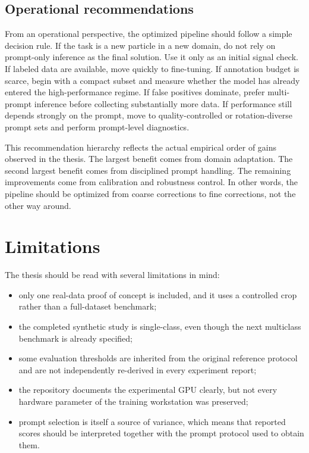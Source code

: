 \documentclass[12pt,a4paper]{report}
\begin{document}
\subsection{Operational recommendations}
From an operational perspective, the optimized pipeline should follow a simple decision rule. If the task is a new particle in a new domain, do not rely on prompt-only inference as the final solution. Use it only as an initial signal check. If labeled data are available, move quickly to fine-tuning. If annotation budget is scarce, begin with a compact subset and measure whether the model has already entered the high-performance regime. If false positives dominate, prefer multi-prompt inference before collecting substantially more data. If performance still depends strongly on the prompt, move to quality-controlled or rotation-diverse prompt sets and perform prompt-level diagnostics.

This recommendation hierarchy reflects the actual empirical order of gains observed in the thesis. The largest benefit comes from domain adaptation. The second largest benefit comes from disciplined prompt handling. The remaining improvements come from calibration and robustness control. In other words, the pipeline should be optimized from coarse corrections to fine corrections, not the other way around.

\section{Limitations}
The thesis should be read with several limitations in mind:
\begin{itemize}
  \item only one real-data proof of concept is included, and it uses a controlled crop rather than a full-dataset benchmark;
  \item the completed synthetic study is single-class, even though the next multiclass benchmark is already specified;
  \item some evaluation thresholds are inherited from the original reference protocol and are not independently re-derived in every experiment report;
  \item the repository documents the experimental GPU clearly, but not every hardware parameter of the training workstation was preserved;
  \item prompt selection is itself a source of variance, which means that reported scores should be interpreted together with the prompt protocol used to obtain them.
\end{itemize}
\end{document}
